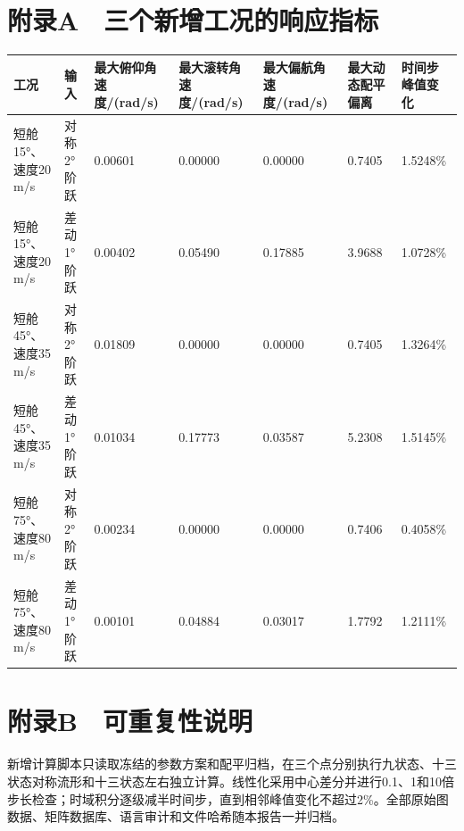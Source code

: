 \chapter{附录A　三个新增工况的响应指标}\label{ux9644ux5f55a-ux4e09ux4e2aux65b0ux589eux5de5ux51b5ux7684ux54cdux5e94ux6307ux6807}

\begin{longtable}[]{@{}lllllll@{}}
\toprule\noalign{}
工况 & 输入 & 最大俯仰角速度/(rad/s) & 最大滚转角速度/(rad/s) &
最大偏航角速度/(rad/s) & 最大动态配平偏离 & 时间步峰值变化 \\
\midrule\noalign{}
\endhead
\bottomrule\noalign{}
\endlastfoot
短舱15°、速度20 m/s & 对称2°阶跃 & 0.00601 & 0.00000 & 0.00000 & 0.7405
& 1.5248\% \\
短舱15°、速度20 m/s & 差动1°阶跃 & 0.00402 & 0.05490 & 0.17885 & 3.9688
& 1.0728\% \\
短舱45°、速度35 m/s & 对称2°阶跃 & 0.01809 & 0.00000 & 0.00000 & 0.7405
& 1.3264\% \\
短舱45°、速度35 m/s & 差动1°阶跃 & 0.01034 & 0.17773 & 0.03587 & 5.2308
& 1.5145\% \\
短舱75°、速度80 m/s & 对称2°阶跃 & 0.00234 & 0.00000 & 0.00000 & 0.7406
& 0.4058\% \\
短舱75°、速度80 m/s & 差动1°阶跃 & 0.00101 & 0.04884 & 0.03017 & 1.7792
& 1.2111\% \\
\end{longtable}

\chapter{附录B　可重复性说明}\label{ux9644ux5f55b-ux53efux91cdux590dux6027ux8bf4ux660e}

新增计算脚本只读取冻结的参数方案和配平归档，在三个点分别执行九状态、十三状态对称流形和十三状态左右独立计算。线性化采用中心差分并进行0.1、1和10倍步长检查；时域积分逐级减半时间步，直到相邻峰值变化不超过2\%。全部原始图数据、矩阵数据库、语言审计和文件哈希随本报告一并归档。
